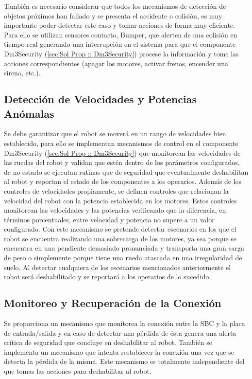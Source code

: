 \documentclass[withindex,glossary]{cam-thesis}
\begin{document}
También es necesario considerar que todos los mecanismos de detección de objetos próximos han fallado y se presenta el accidente o colisión, es muy importante poder detectar este caso y tomar acciones de forma muy eficiente. Para ello se utilizan sensores contacto, \gls{Bumper}, que alerten de una colisión en tiempo real generando una interrupción en el sistema para que el componente Dm3Security (\ref{sec:Sol Prop :: Dm3Security}) procese la información y tome las acciones correspondientes (apagar los motores, activar frenos, encender una sirena, etc.).

\subsection{Detección de Velocidades y Potencias Anómalas} \label{sec:Sol Prop :: detección de velocidades y potencias anómalas}
Se debe garantizar que el robot se moverá en un rango de velocidades bien establecido, para ello se implementan mecanismos de control en el componente Dm3Security (\ref{sec:Sol Prop :: Dm3Security}) que monitorean las velocidades de las ruedas del robot y validan que estén dentro de los parámetros configurados, de no estarlo se ejecutan rutinas que de seguridad que eventualmente deshabilitan al robot y reportan el estado de los componentes a los operarios.
Además de los controles de velocidades propiamente, se definen controles que relacionan la velocidad del robot con la potencia establecida en los motores. Estos controles monitorean las velocidades y las potencias verificando que la diferencia, en términos porcentuales, entre velocidad y potencia no supere a un valor configurado. Con este mecanismo se pretende detectar escenarios en los que el robot se encuentra realizando una sobrecarga de los motores, ya sea porque se encuentra en una pendiente demasiado pronunciada y transporta una gran carga de peso o simplemente porque tiene una rueda atascada en una irregularidad de suelo.
Al detectar cualquiera de los escenarios mencionados anteriormente el robot será deshabilitado y se reportará a los operarios de lo sucedido.

\subsection{Monitoreo y Recuperación de la Conexión} \label{sec:Sol Prop :: monitoreo y recuperación de la conexión}
Se proporciona un mecanismo que monitorea la conexión entre la \gls{SBC} y la placa de entrada/salida y en caso de detectar una pérdida de ésta genera una alerta crítica de seguridad que concluye en deshabilitar al robot. También se implementa un mecanismo que intenta restablecer la conexión una vez que se detecta la pérdida de la misma. Este mecanismo es totalmente independiente del que tomas las acciones para deshabilitar al robot.
\end{document}
